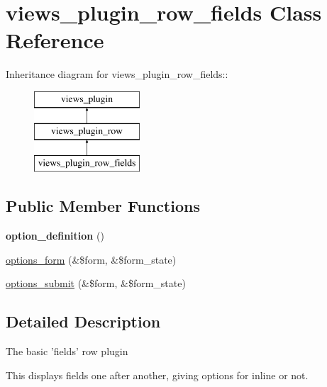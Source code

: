 \hypertarget{classviews__plugin__row__fields}{
\section{views\_\-plugin\_\-row\_\-fields Class Reference}
\label{classviews__plugin__row__fields}
}
Inheritance diagram for views\_\-plugin\_\-row\_\-fields::\begin{figure}[H]
\begin{center}
\leavevmode
\includegraphics[height=3cm]{classviews__plugin__row__fields}
\end{center}
\end{figure}
\subsection*{Public Member Functions}
\begin{DoxyCompactItemize}
\item 
\hypertarget{classviews__plugin__row__fields_a85538eaa61f4a19de68a693876137934}{
{\bfseries option\_\-definition} ()}
\label{classviews__plugin__row__fields_a85538eaa61f4a19de68a693876137934}

\item 
\hyperlink{classviews__plugin__row__fields_abb87b6c98697fb676638759cb95072e3}{options\_\-form} (\&\$form, \&\$form\_\-state)
\item 
\hyperlink{classviews__plugin__row__fields_ab9bddfa302a7098aad70693840bbbb6e}{options\_\-submit} (\&\$form, \&\$form\_\-state)
\end{DoxyCompactItemize}


\subsection{Detailed Description}
The basic 'fields' row plugin

This displays fields one after another, giving options for inline or not. 

